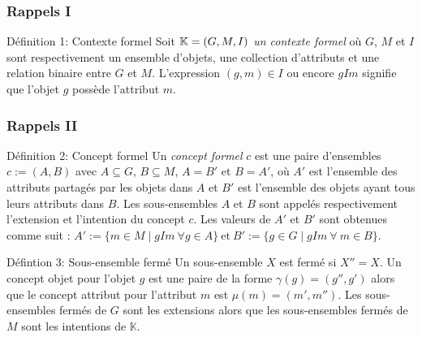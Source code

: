 \documentclass[french]{beamer}
\def\KK{\mathbb{K}}
\begin{document}
\begin{frame}
\frametitle{Rappels I}
\begin{block}{Définition 1: Contexte formel}
Soit $\KK = \GMI$ \emph{un contexte formel} où $G$, $M$ et $I$ sont respectivement un ensemble d'objets, une collection d'attributs et une relation binaire entre $G$ et $M$. L'expression $(g,m) \in I$ ou encore $gIm$ signifie que l'objet $g$ possède l'attribut $m$.
\end{block}

\begin{table}[H]
\begin{center}
\begin{cxt}%
\cxtName{}%
%
%
%
%
%
%
\end{cxt}
\end{center}
\caption{Exemple de contexte \context}
\label{cap:context-simple}
\end{table}

\end{frame}
\begin{frame}
\frametitle{Rappels II}

\begin{block}{Définition 2: Concept formel}
Un \emph{concept formel} $c$ est une paire d'ensembles $c:= (A,B)$ avec $A \subseteq G$, $B \subseteq M$, $A=B'$ et $B=A'$, où $A'$ est l'ensemble des attributs partagés par les objets dans $A$ et $B'$ est l'ensemble des objets ayant tous leurs attributs dans $B$. Les sous-ensembles $A$ et $B$ sont appelés respectivement l'extension et l'intention du concept $c$. Les valeurs de $A'$ et $B'$ sont obtenues comme suit : 
$A':=\{m \in M \mid g I m\ \forall g \in A\}\ \text{et}\ B':=\{g \in G \mid g I m\ \forall~m \in B\}$.
\end{block}


\begin{block}{Défintion 3: Sous-ensemble fermé}
Un sous-ensemble $X$ est fermé si $X''=X$. Un concept objet pour l'objet $g$ est une paire de la forme $\gamma(g)=(g'', g')$ alors que le concept attribut pour l'attribut $m$ est $\mu(m)=(m', m'')$.
Les sous-ensembles fermés de $G$ sont les extensions alors que les sous-ensembles fermés de $M$ sont les intentions de $\KK$.
\end{block}
\end{frame}
\end{document}
